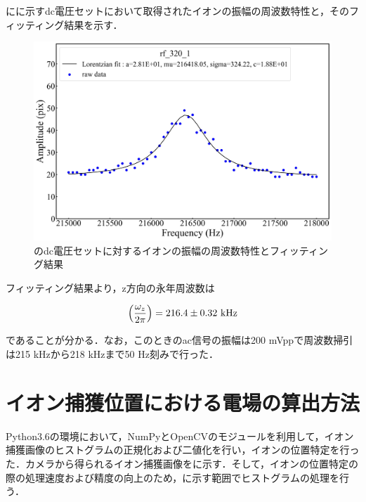 にに示すdc電圧セットにおいて取得されたイオンの振幅の周波数特性と，そのフィッティング結果を示す．

\begin{figure}[h]
	\centering
		\includegraphics[width = 0.4\linewidth]{./methods/figure/fitting_result.jpg}
		\caption{のdc電圧セットに対するイオンの振幅の周波数特性とフィッティング結果}
		\label{fig:fitting_result}
\end{figure}

フィッティング結果より，z方向の永年周波数は

\begin{align}
\left( \frac{\omega_z}{2\pi}\right) = 216.4 \pm 0.32 \  {\rm kHz} \notag
\end{align}

であることが分かる．なお，このときのac信号の振幅は200 mVppで周波数掃引は215 kHzから218 kHzまで50 Hz刻みで行った．

\section{イオン捕獲位置における電場の算出方法}

Python3.6の環境において，NumPyとOpenCVのモジュールを利用して，イオン捕獲画像のヒストグラムの正規化および二値化を行い，イオンの位置特定を行った．カメラから得られるイオン捕獲画像をに示す．そして，イオンの位置特定の際の処理速度および精度の向上のため，に示す範囲でヒストグラムの処理を行う．

